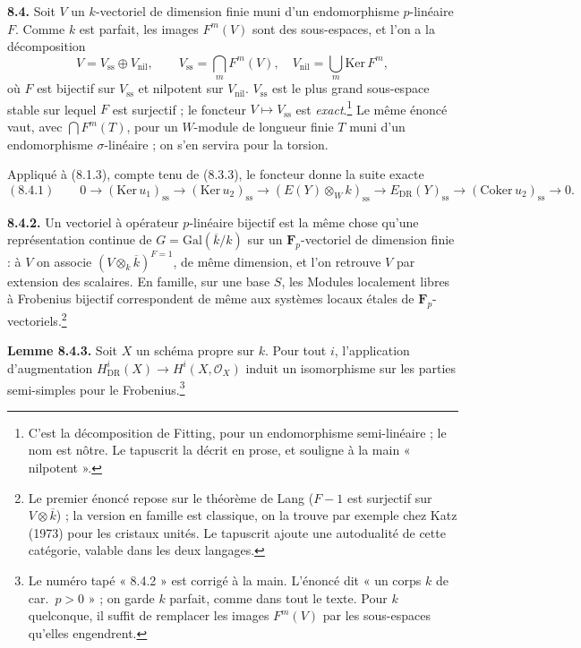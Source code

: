\documentclass[11pt,a4paper]{article}
\begin{document}
\textbf{8.4.} Soit $V$ un $k$-vectoriel de dimension finie muni d'un
endomorphisme $p$-linéaire $F$. Comme $k$ est parfait, les images
$F^{m}(V)$ sont des sous-espaces, et l'on a la décomposition
\[
V = V_{\mathrm{ss}} \oplus V_{\mathrm{nil}}, \qquad
V_{\mathrm{ss}} = \bigcap_{m} F^{m}(V), \quad
V_{\mathrm{nil}} = \bigcup_{m} \mathrm{Ker}\, F^{m} ,
\]
où $F$ est bijectif sur $V_{\mathrm{ss}}$ et nilpotent sur $V_{\mathrm{nil}}$.
$V_{\mathrm{ss}}$ est le plus grand sous-espace stable sur lequel $F$ est
surjectif ; le foncteur $V \mapsto V_{\mathrm{ss}}$ est
\emph{exact}.\footnote{C'est la décomposition de Fitting, pour un
endomorphisme semi-linéaire ; le nom est nôtre. Le tapuscrit la décrit en
prose, et souligne à la main « nilpotent ».} Le même énoncé vaut, avec
$\bigcap F^{m}(T)$, pour un $W$-module de longueur finie $T$ muni d'un
endomorphisme $\sigma$-linéaire ; on s'en servira pour la torsion.

Appliqué à (8.1.3), compte tenu de (8.3.3), le foncteur donne la suite
exacte
\[
(8.4.1) \qquad 0 \to (\mathrm{Ker}\, u_{1})_{\mathrm{ss}} \to
(\mathrm{Ker}\, u_{2})_{\mathrm{ss}} \to (E(Y) \otimes_{W} k)_{\mathrm{ss}}
\to E_{\mathrm{DR}}(Y)_{\mathrm{ss}} \to (\mathrm{Coker}\, u_{2})_{\mathrm{ss}}
\to 0 .
\]

\textbf{8.4.2.} Un vectoriel à opérateur $p$-linéaire bijectif est la même
chose qu'une représentation continue de $G = \mathrm{Gal}(\overline{k}/k)$ sur
un $\mathbf{F}_{p}$-vectoriel de dimension finie : à $V$ on associe
$(V \otimes_{k} \overline{k})^{F = 1}$, de même dimension, et l'on retrouve
$V$ par extension des scalaires. En famille, sur une base $S$, les Modules
localement libres à Frobenius bijectif correspondent de même aux systèmes
locaux étales de $\mathbf{F}_{p}$-vectoriels.\footnote{Le premier énoncé
repose sur le théorème de Lang ($F - 1$ est surjectif sur
$V \otimes \overline{k}$) ; la version en famille est classique, on la trouve
par exemple chez Katz (1973) pour les cristaux unités. Le tapuscrit ajoute une
autodualité de cette catégorie, valable dans les deux langages.}

\textbf{Lemme 8.4.3.} Soit $X$ un schéma propre sur $k$. Pour tout $i$,
l'application d'augmentation $H^{i}_{\mathrm{DR}}(X) \to H^{i}(X,
\mathcal{O}_{X})$ induit un isomorphisme sur les parties semi-simples pour
le Frobenius.\footnote{Le numéro tapé « 8.4.2 » est corrigé à la main.
L'énoncé dit « un corps $k$ de car.\ $p > 0$ » ; on garde $k$ parfait, comme
dans tout le texte. Pour $k$ quelconque, il suffit de remplacer les images
$F^{m}(V)$ par les sous-espaces qu'elles engendrent.}
\end{document}
